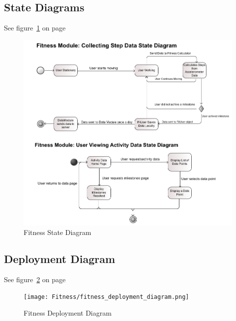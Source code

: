\subsection{State Diagrams}
See figure~\ref{fig:fitness_state_diagram} on page~\pageref{fig:fitness_state_diagram}
\begin{figure}
	\centering
	\includegraphics[scale=0.54]{Fitness/fitness_state_diagram.png}
	\caption{Fitness State Diagram}
	\label{fig:fitness_state_diagram}
\end{figure}

\subsection{Deployment Diagram}
See figure~\ref{fig:fitness_deployment_diagram} on page~\pageref{fig:fitness_deployment_diagram}
\begin{figure}
	\centering
	\texttt{[image: Fitness/fitness\_deployment\_diagram.png]}
	\caption{Fitness Deployment Diagram}
	\label{fig:fitness_deployment_diagram}
\end{figure}

